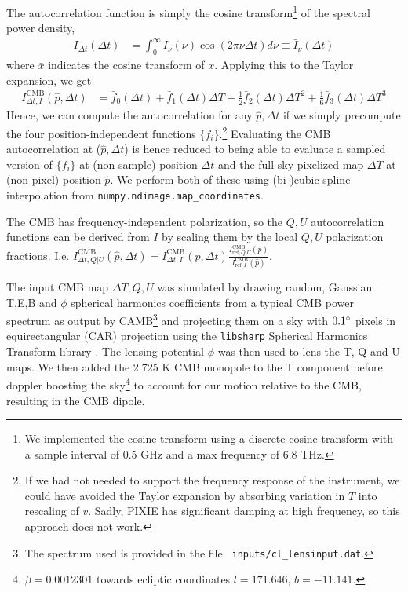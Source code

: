 \documentclass{article}
\newcommand{\code}[1]{\texttt{#1}}
\begin{document}
The autocorrelation function is simply the cosine transform\footnote{
We implemented the cosine transform using a discrete cosine transform with a
sample interval of 0.5 GHz and a max frequency of 6.8 THz.} of the spectral power
density,
\begin{align}
	I_{\Delta t}(\Delta t) &= \int_{0}^\infty I_\nu(\nu) \cos(2\pi\nu\Delta t) d\nu
	\equiv \bar I_\nu(\Delta t)
\end{align}
where $\bar{x}$ indicates the cosine transform of $x$.
Applying this to the Taylor expansion, we get
\begin{align}
I^\textrm{CMB}_{\Delta t,I}(\hat p,\Delta t) &= \bar f_0(\Delta t) + \bar f_1(\Delta t) \Delta T + \frac12 \bar f_2(\Delta t) \Delta T^2 + \frac16 \bar f_3(\Delta t) \Delta T^3
\end{align}
Hence, we can compute the autocorrelation for any $\hat p,\Delta t$ if we simply precompute
the four position-independent functions $\{f_i\}$.\footnote{
If we had not needed to support the frequency response of the instrument,
we could have avoided the Taylor expansion by absorbing variation in $T$
into rescaling of $v$. Sadly, PIXIE has significant damping at high frequency,
so this approach does not work.} Evaluating the CMB autocorrelation at ($\hat p,\Delta t$)
is hence reduced to being able to evaluate a sampled version of $\{f_i\}$
at (non-sample) position $\Delta t$ and
the full-sky pixelized map $\Delta T$ at (non-pixel) position $\hat p$.
We perform both of these using (bi-)cubic spline interpolation
from \code{numpy.ndimage.map\_coordinates}.

The CMB has frequency-independent polarization,
so the $Q,U$ autocorrelation functions can be derived from $I$ by scaling them by
the local $Q,U$ polarization fractions. I.e. $I^\textrm{CMB}_{\Delta t,Q|U}(\hat p,\Delta t) = I^\textrm{CMB}_{\Delta t,I}(\hat p,\Delta t) \frac{I^\textrm{CMB}_{\textrm{ref},Q|U}(\hat p)}{I^\textrm{CMB}_{\textrm{ref},I}(\hat p)}$.

The input CMB map $\Delta T,Q,U$ was simulated by drawing random, Gaussian
T,E,B and $\phi$ spherical harmonics coefficients from a typical CMB power spectrum
as output by CAMB\footnote{The spectrum used is provided in the file \code{
	inputs/cl\_lensinput.dat}.} and projecting them on a sky with $0.1\degree$
pixels in equirectangular (CAR) projection using the \code{libsharp} Spherical
Harmonics Transform library \citet{libsharp}. The lensing potential $\phi$ was then used to
lens the T, Q and U maps. We then added the 2.725 K CMB monopole to the T
component before doppler boosting the sky\footnote{$\beta=0.0012301$ towards
ecliptic coordinates $l=171.646$, $b=-11.141$.}
to account for our motion relative to the CMB, resulting in the CMB dipole.
\end{document}
